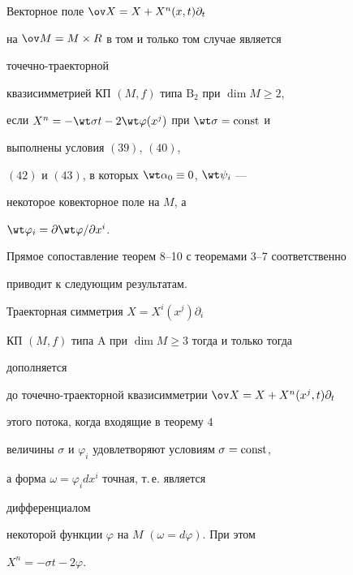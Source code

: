  


\begin{thm} 


Векторное поле $\ov X=X+X^n(x,t)\partial_t$ 


на $\ov M=M\times R$ в том и только том случае является 


точечно-траекторной 


квазисимметрией КП $(M,f)$ типа $\mathrm B_2$ при $\dim M\ge2$, 


если $X^n=-\wt\sigma t-2\wt\varphi(x^j)$ при $\wt\sigma=\const$ и 


выполнены условия $(39)$, $(40)$, 


$(42)$ и $(43)$, в которых $\wt\alpha_0\equiv0$, $\wt\psi_i$ --- 


некоторое ковекторное поле на $M$, а 


$\wt\varphi_i=\partial\wt\varphi/\partial x^i$. 


\end{thm} 


 


Прямое сопоставление теорем 8--10 с теоремами 3--7 соответственно 


приводит к следующим результатам. 


 


\begin{thm} 


Траекторная симметрия $X=X^i(x^j)\partial_i$ 


КП $(M,f)$ типа $\mathrm A$ при $\dim M\ge3$ тогда и только тогда 


дополняется 


до точечно-траекторной квазисимметрии $\ov X=X+X^n(x^j,t)\partial_t$ 


этого потока, когда входящие в теорему $4$ 


величины $\sigma$ и $\varphi_i$ удовлетворяют условиям $\sigma=\operatorname{const}$, 


а форма $\omega=\varphi_i dx^i$ точная, т.\,е. является 


дифференциалом 


некоторой функции $\varphi$ на $M$ $(\omega=d\varphi)$. При этом 


$X^n=-\sigma t-2\varphi$. 


\end{thm} 


 


